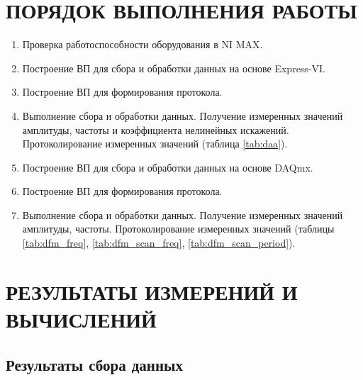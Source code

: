 \documentclass[a4paper,14pt]{article}
\begin{document}
\section{ПОРЯДОК ВЫПОЛНЕНИЯ РАБОТЫ}
\begin{enumerate}
	\item Проверка работоспособности оборудования в NI MAX. 
	\item Построение ВП для сбора и обработки данных на основе Express-VI.
	\item Построение ВП для формирования протокола. 
	\item Выполнение сбора и обработки данных. Получение измеренных значений амплитуды, частоты и коэффициента нелинейных искажений. Протоколирование измеренных значений (таблица \ref{tab:daa}).
	
	\item Построение ВП для сбора и обработки данных на основе DAQmx.
	\item Построение ВП для формирования протокола. 
	\item Выполнение сбора и обработки данных. Получение измеренных значений амплитуды, частоты. Протоколирование измеренных значений (таблицы \ref{tab:dfm_freq}, \ref{tab:dfm_scan_freq}, \ref{tab:dfm_scan_period}).
\end{enumerate}

\section{РЕЗУЛЬТАТЫ ИЗМЕРЕНИЙ И ВЫЧИСЛЕНИЙ}

\subsection{Результаты сбора данных}
\end{document}
